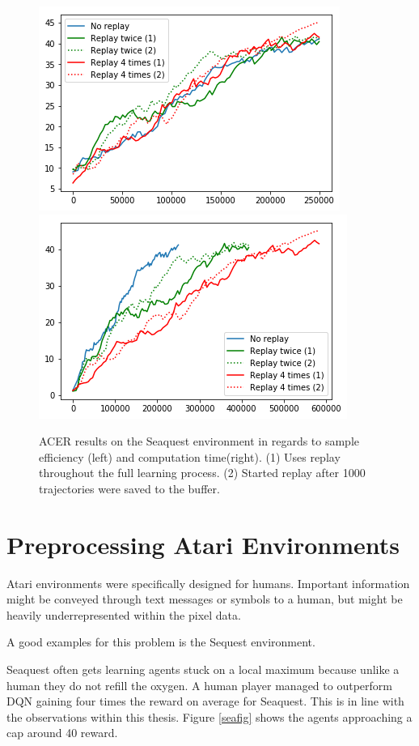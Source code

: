 \begin{figure}[h]
\includegraphics[scale=0.55]{bilder/seaquestreplayonline.png}
\includegraphics[scale=0.55]{bilder/seaquestreplaytime.png}
\caption{ACER results on the Seaquest environment in regards to sample efficiency (left) and computation time(right). (1) Uses replay throughout the full learning process. (2) Started replay after 1000 trajectories were saved to the buffer.}
\end{figure}


\pagebreak




\section{Preprocessing Atari Environments}

Atari environments were specifically designed for humans. Important information might be conveyed through text messages or symbols to a human, but might be heavily underrepresented within the pixel data.

A good examples for this problem is the Sequest environment. 

Seaquest often gets learning agents stuck on a local maximum because unlike a human they do not refill the oxygen.
A human player managed to outperform DQN \citep{nature} gaining four times the reward on average for Seaquest.
This is in line with the observations within this thesis. Figure \ref{seafig} shows the agents approaching a cap around 40 reward.

